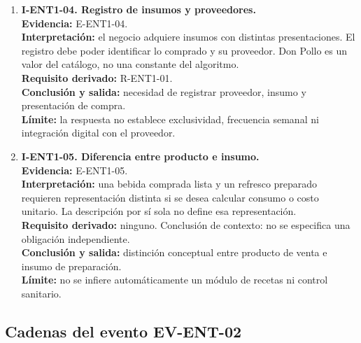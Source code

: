\begin{enumerate}
  \item \textbf{I-ENT1-04. Registro de insumos y proveedores.}\\
  \textbf{Evidencia:} E-ENT1-04.\\
  \textbf{Interpretación:} el negocio adquiere insumos con distintas
  presentaciones. El registro debe poder identificar lo comprado y su
  proveedor. Don Pollo es un valor del catálogo, no una constante del
  algoritmo.\\
  \textbf{Requisito derivado:} R-ENT1-01.\\
  \textbf{Conclusión y salida:} necesidad de registrar proveedor, insumo y
  presentación de compra.\\
  \textbf{Límite:} la respuesta no establece exclusividad, frecuencia
  semanal ni integración digital con el proveedor.

  \item \textbf{I-ENT1-05. Diferencia entre producto e insumo.}\\
  \textbf{Evidencia:} E-ENT1-05.\\
  \textbf{Interpretación:} una bebida comprada lista y un refresco preparado
  requieren representación distinta si se desea calcular consumo o costo
  unitario. La descripción por sí sola no define esa representación.\\
  \textbf{Requisito derivado:} ninguno. Conclusión de contexto: no se
  especifica una obligación independiente.\\
  \textbf{Conclusión y salida:} distinción conceptual entre producto de
  venta e insumo de preparación.\\
  \textbf{Límite:} no se infiere automáticamente un módulo de recetas ni
  control sanitario.
\end{enumerate}

\subsection{Cadenas del evento EV-ENT-02}
\label{subsec:ilacion-ent2}

